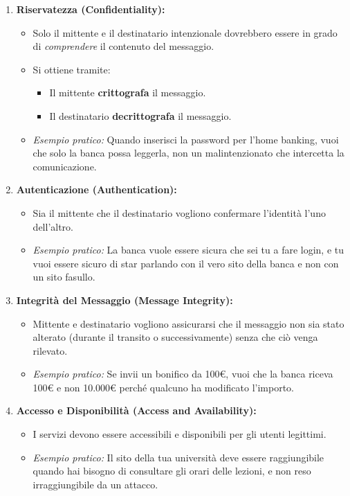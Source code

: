 \begin{enumerate}[label=\arabic*.]
    \item \textbf{Riservatezza (Confidentiality):}
    \begin{itemize}
        \item Solo il mittente e il destinatario intenzionale dovrebbero essere in grado di \textit{comprendere} il contenuto del messaggio.
        \item Si ottiene tramite:
        \begin{itemize}
            \item Il mittente \textbf{crittografa} il messaggio.
            \item Il destinatario \textbf{decrittografa} il messaggio.
        \end{itemize}
        \item \textit{Esempio pratico:} Quando inserisci la password per l'home banking, vuoi che solo la banca possa leggerla, non un malintenzionato che intercetta la comunicazione.
    \end{itemize}

    \item \textbf{Autenticazione (Authentication):}
    \begin{itemize}
        \item Sia il mittente che il destinatario vogliono confermare l'identità l'uno dell'altro.
        \item \textit{Esempio pratico:} La banca vuole essere sicura che sei tu a fare login, e tu vuoi essere sicuro di star parlando con il vero sito della banca e non con un sito fasullo.
    \end{itemize}

    \item \textbf{Integrità del Messaggio (Message Integrity):}
    \begin{itemize}
        \item Mittente e destinatario vogliono assicurarsi che il messaggio non sia stato alterato (durante il transito o successivamente) senza che ciò venga rilevato.
        \item \textit{Esempio pratico:} Se invii un bonifico da 100€, vuoi che la banca riceva 100€ e non 10.000€ perché qualcuno ha modificato l'importo.
    \end{itemize}

    \item \textbf{Accesso e Disponibilità (Access and Availability):}
    \begin{itemize}
        \item I servizi devono essere accessibili e disponibili per gli utenti legittimi.
        \item \textit{Esempio pratico:} Il sito della tua università deve essere raggiungibile quando hai bisogno di consultare gli orari delle lezioni, e non reso irraggiungibile da un attacco.
    \end{itemize}
\end{enumerate}

